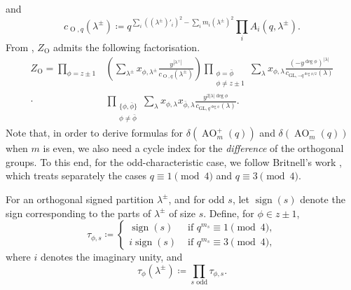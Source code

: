 \documentclass[a4paper, 12pt, oneside]{amsart}
\theoremstyle{definition}
\newcommand{\GL}{\mathrm{GL}}
\DeclareMathOperator{\AO}{AO}
\DeclareMathOperator{\Or}{O}
\DeclareMathOperator{\sign}{sign}
\begin{document}
and
\begin{equation}
\label{c_O}
c_{\Or,q}(\lambda^{\pm})\coloneqq q^{\sum_i((\lambda^{\pm})'_i)^2-\sum_im_i(\lambda^{\pm})^2}\prod_iA_i(q,\lambda^{\pm}).
\end{equation}
From \cite[Theorem 14]{Fulman_cycle_index}, $Z_{\Or}$ admits the following factorisation.
\begin{align}
\label{factorisation_ci_sum_ort}
Z_{\Or}=\prod_{\phi=z\pm1}&\left(\sum_{\lambda^{\pm}}x_{\phi,\lambda^{\pm}}\frac{y^{|\lambda^{\pm}|}}{c_{\Or,q}(\lambda^{\pm})}\right)\prod_{\substack{\phi=\bar{\phi}\\\phi \neq z\pm1}}\sum_{\lambda}x_{\phi,\lambda}\frac{(-y^{\deg \phi})^{|\lambda|}}{c_{\GL,-q^{\deg \phi/2}}(\lambda)} \nonumber\\
\cdot&
\prod_{\substack{\{\phi,\bar{\phi}\}\\\phi \neq \bar{\phi}}}\sum_{\lambda}x_{\phi,\lambda}x_{\bar{\phi},\lambda}
\frac{y^{2|\lambda|\deg \phi}}{c_{\GL,q^{\deg \phi}}(\lambda)}.
\end{align}
Note that, in order to derive formulas for $\delta({\AO^{+}_{m}(q)})$ and  $\delta({\AO^{-}_{m}(q)})$ when $m$ is even, we also need a cycle index for the \textit{difference} of the orthogonal groups. To this end, for the odd-characteristic case, we follow Britnell's work \cite{Britnell_difference_orth}, which treats separately the cases $q \equiv 1 \pmod 4$ and $q \equiv 3\pmod 4$.

For an orthogonal signed partition $\lambda^{\pm}$, and for odd $s$, let $\sign(s)$ denote the sign corresponding to the parts of $\lambda^{\pm}$ of size $s$. Define, for  $\phi \in {z\pm 1}$,
\begin{equation*}
 \tau_{\phi,s}\coloneqq
\begin{cases}
    \sign(s) & \text{ if }q^{m_s} \equiv 1 \pmod 4, \\
    i\sign(s)&  \text{ if }q^{m_s} \equiv 3 \pmod 4,
\end{cases}
\end{equation*}
 where $i$ denotes the imaginary unity, and 
 \begin{equation}
 \label{tau_phi}
\tau_{\phi}(\lambda^{\pm}) \coloneqq \prod_{s \text{ odd}}\tau_{\phi,s}.
 \end{equation}
\end{document}
